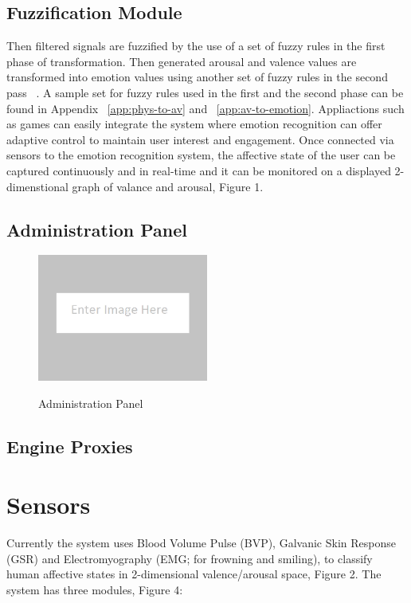 \subsection{Fuzzification Module} \label{subsec:fuzzi} %
Then filtered signals are fuzzified by the use of a set of fuzzy rules in the first phase of transformation. Then generated arousal and valence values are transformed into emotion values using another set of fuzzy rules in the second pass ~\cite{mandryk2007fuzzy}. A sample set for fuzzy rules used in the first and the second phase can be found in Appendix ~\ref{app:phys-to-av} and ~\ref{app:av-to-emotion}. Appliactions such as games can easily integrate the system where emotion recognition can offer adaptive control to maintain user interest and engagement. Once connected via sensors to the emotion recognition system, the affective state of the user can be captured continuously and in real-time and it can be monitored on a displayed 2-dimenstional graph of valance and arousal, Figure 1.


\subsection{Administration Panel}

\begin{figure}[h!]
  \caption[Administration Panel]
  {Administration Panel}
  \centering
  \includegraphics[width=0.5\textwidth]{images/placeholder.png}
  \label{fig:administration-panel}
\end{figure}

\subsection{Engine Proxies}

\section{Sensors}

Currently the system uses Blood Volume Pulse (BVP), Galvanic Skin Response (GSR) and Electromyography (EMG; for frowning and smiling), to classify human affective states in 2-dimensional valence/arousal space, Figure 2. The system has three modules, Figure 4:

